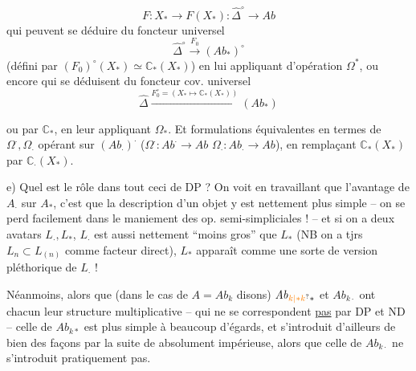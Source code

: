 

\[
F:X_{\ast}\longrightarrow F(X_{\ast}):\widehat\Delta^{\circ}\longrightarrow\mathit{Ab}
\]
qui peuvent se déduire du foncteur
universel
\[
\widehat\Delta^{\circ}\xrightarrow{F_0}(\mathit{Ab}_{\ast})^{\circ}
\]
(défini par $(F_0)^{\circ}(X_{\ast})\simeq\mathbb C_{\ast}(X_{\ast})$)
en lui appliquant d'opération $\Omega^{\ast}$,
ou encore qui se déduisent du
foncteur cov. universel
\[
\widehat\Delta\xrightarrow{F_0^{\circ}=(X_{\ast}\mapsto\mathbb C_{\ast}(X_{\ast}))}(\mathit{Ab}_{\ast})
\]

 ou  par $\mathbb C_{\ast}$, en leur
appliquant  $\Omega_{\ast}$. Et   formulations
équivalentes en termes de $\Omega^{\cdot},\Omega_{\cdot}$
opérant sur $(\mathit{Ab}_{\cdot})^{\cdot}$ ($\Omega^{\cdot}:\mathit{Ab}^{\cdot}\longrightarrow\mathit{Ab}$
$\Omega_{\cdot}:\mathit{Ab}_{\cdot}\longrightarrow\mathit{Ab}$), en remplaçant
$\mathbb C_{\ast}(X_{\ast})$ par $\mathbb C_{\cdot}(X_{\ast})$.

e) Quel est le rôle dans tout ceci de DP ?
On voit en travaillant que l'avantage
de $A_{\cdot}$ sur $A_{\ast}$, c'est que la description
d'un objet y est nettement plus simple
-- on se perd facilement dans le
maniement des op. semi-simpliciales ! --
et si on a deux avatars $L_{\cdot},L_{\ast}$,
$L_{\cdot}$ est aussi nettement ``moins gros''
que $L_{\ast}$ (NB on a tjrs $L_n\subset L_{(n)}$ comme
facteur direct), $L_{\ast}$ apparaît comme
une sorte de version pléthorique de $L_{\cdot}$ !

Néanmoins, alors que (dans le cas de
$A=\mathit{Ab}_{k}$ disons) $\mathit{Ab}_{\unsure{k|{\ast}k}\ast}$ et $\mathit{Ab}_{k\cdot}$ ont chacun
leur structure multiplicative -- qui
ne se correspondent \uline{pas} par DP et ND --
celle de $\mathit{Ab}_{k\ast}$ est plus simple à beaucoup
d'égards, et s'introduit d'ailleurs de
bien des façons par la suite de 
absolument impérieuse, alors que celle
de $\mathit{Ab}_{k\cdot}$ ne s'introduit pratiquement pas.

